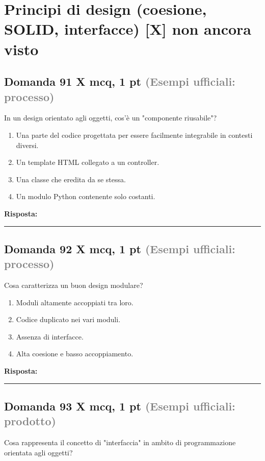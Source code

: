 \documentclass[a4paper,11pt]{article}
\begin{document}
\section{Principi di design (coesione, SOLID, interfacce) [X] non ancora visto}

\subsection*{Domanda 91 X \hfill {\small mcq, 1 pt \textcolor{gray}{(Esempi ufficiali: processo)}}}
In un design orientato agli oggetti, cos'è un "componente riusabile"?

\begin{enumerate}[label=\alph*)]
\item Una parte del codice progettata per essere facilmente integrabile in contesti diversi.
\item Un template HTML collegato a un controller.
\item Una classe che eredita da se stessa.
\item Un modulo Python contenente solo costanti.
\end{enumerate}
\vspace{0.2cm}
\noindent\textbf{Risposta:}\par
\vspace{1.5cm}\hrule


\subsection*{Domanda 92 X \hfill {\small mcq, 1 pt \textcolor{gray}{(Esempi ufficiali: processo)}}}
Cosa caratterizza un buon design modulare?

\begin{enumerate}[label=\alph*)]
\item Moduli altamente accoppiati tra loro.
\item Codice duplicato nei vari moduli.
\item Assenza di interfacce.
\item Alta coesione e basso accoppiamento.
\end{enumerate}
\vspace{0.2cm}
\noindent\textbf{Risposta:}\par
\vspace{1.5cm}\hrule


\subsection*{Domanda 93 X \hfill {\small mcq, 1 pt \textcolor{gray}{(Esempi ufficiali: prodotto)}}}
Cosa rappresenta il concetto di "interfaccia" in ambito di programmazione orientata agli oggetti?
\end{document}
